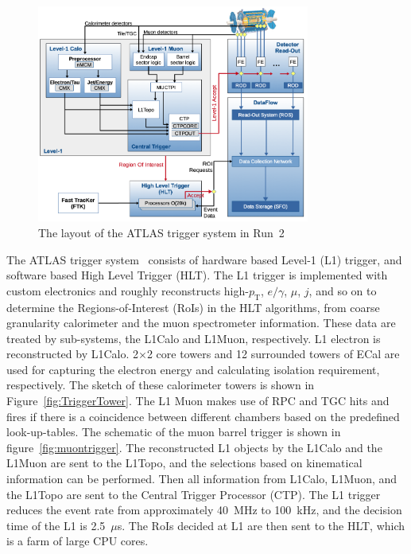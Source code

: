 \begin{figure}[tbp]
\begin{center}
 \includegraphics[width=0.8\textwidth,keepaspectratio]{figures/detector/Trigger}
\caption{
The layout of the ATLAS trigger system in Run~2
}
\label{fig:Trigger}
\end{center}
\end{figure}
The ATLAS trigger system~\cite{TRIG-2019-04} consists of hardware based Level-1 (L1) trigger, and software based High Level Trigger (HLT). 
The L1 trigger is implemented with custom electronics and roughly reconstructs high-$p_\mathrm{T}$, $e/\gamma$, $\mu$, $j$, and so on to determine the Regions-of-Interest (RoIs) in the HLT algorithms, from coarse granularity calorimeter and the muon spectrometer information. 
These data are treated by sub-systems, the L1Calo and L1Muon, respectively. 
L1 electron is reconstructed by L1Calo. 2$\times$2 core towers and 12 surrounded towers of ECal are used for capturing the electron energy and calculating isolation requirement, respectively. The sketch of these calorimeter towers is shown in Figure~\ref{fig:TriggerTower}.
The L1 Muon makes use of RPC and TGC hits and fires if there is a coincidence between different chambers based on the predefined look-up-tables.
The schematic of the muon barrel trigger is shown in figure~\ref{fig:muontrigger}.
The reconstructed L1 objects by the L1Calo and the L1Muon are sent to the L1Topo, and the selections based on kinematical information can be performed. 
Then all information from L1Calo, L1Muon, and the L1Topo are sent to the Central Trigger Processor (CTP). 
The L1 trigger reduces the event rate from approximately 40~MHz to 100~kHz, and the decision time of the L1 is 2.5~$\mu$s.
The RoIs decided at L1 are then sent to the HLT, which is a farm of large CPU cores.
